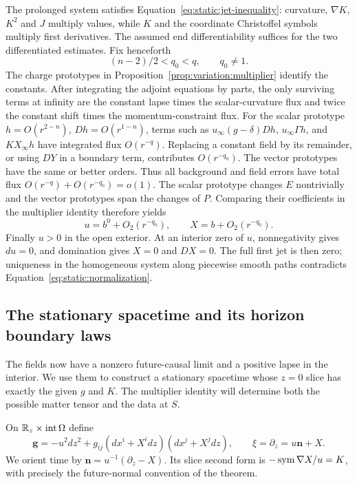 The prolonged system satisfies Equation~\eqref{eq:static:jet-inequality}:
curvature, $\nabla K$, $K^2$ and $J$ multiply values, while $K$ and
the coordinate Christoffel symbols multiply first derivatives.
The assumed end differentiability suffices for the two differentiated
estimates.  Fix henceforth
\begin{equation}\label{eq:static:q0}
 (n-2)/2<q_0<q,\qquad q_0\ne1.
\end{equation}
The charge prototypes in Proposition~\ref{prop:variation:multiplier}
identify the constants.  After integrating the adjoint equations by
parts, the only surviving terms at infinity are the constant lapse
times the scalar-curvature flux and twice the constant shift times
the momentum-constraint flux.  For the scalar prototype
$h=O(r^{2-n})$, $Dh=O(r^{1-n})$, terms such as
$u_\infty(g-\delta)Dh$, $u_\infty\Gamma h$, and
$KX_\infty h$ have integrated flux $O(r^{-q})$.
Replacing a constant field by its remainder, or using $DY$ in a
boundary term, contributes $O(r^{-q_0})$.  The vector prototypes
have the same or better orders.  Thus all background and field
errors have total flux $O(r^{-q})+O(r^{-q_0})=o(1)$.
The scalar prototype changes $E$ nontrivially
and the vector prototypes span the changes of $P$.  Comparing their
coefficients in the multiplier identity therefore yields
\begin{equation}\label{eq:static:normalization}
 u=b^0+O_2(r^{-q_0}),\qquad X=b+O_2(r^{-q_0}).
\end{equation}
Finally $u>0$ in the open exterior.  At an interior zero of $u$,
nonnegativity gives $du=0$, and domination gives $X=0$ and $DX=0$.
The full first jet is then zero; uniqueness in the homogeneous
system along piecewise smooth paths contradicts
Equation~\eqref{eq:static:normalization}.

\subsection{The stationary spacetime and its horizon boundary laws}

The fields now have a nonzero future-causal limit and a positive lapse
in the interior.  We use them to construct a stationary spacetime whose
$z=0$ slice has exactly the given $g$ and $K$.  The multiplier identity
will determine both the possible matter tensor and the data at $S$.

On $\mathbb R_z\times\operatorname{int}\Omega$ define
\begin{equation}\label{eq:static:stationary-metric}
 \mathbf g=-u^2dz^2+g_{ij}(dx^i+X^i dz)(dx^j+X^j dz),
 \qquad \xi=\partial_z=u\mathbf n+X.
\end{equation}
We orient time by $\mathbf n=u^{-1}(\partial_z-X)$.
Its slice second form is
$-\operatorname{sym}\nabla X/u=K$, with precisely the future-normal convention
of the theorem.

